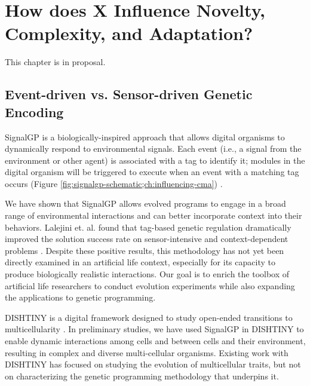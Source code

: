 \chapter{How does X Influence Novelty, Complexity, and Adaptation?}
\label{ch:influencing-cna}

\noindent
This chapter is in proposal.

\section{Event-driven vs. Sensor-driven Genetic Encoding}

SignalGP is a biologically-inspired approach that allows digital organisms to dynamically respond to environmental signals.
Each event (i.e., a signal from the environment or other agent) is associated with a tag to identify it; modules in the digital organism will be triggered to execute when an event with a matching tag occurs (Figure \ref{fig:signalgp-schematic;ch:influencing-cma}) \citep{lalejini2018evolving}.

We have shown that SignalGP allows evolved programs to engage in a broad range of environmental interactions and can better incorporate context into their behaviors.
Lalejini et. al. found that tag-based genetic regulation dramatically improved the solution success rate on sensor-intensive and context-dependent problems \citep{lalejini2018evolving, lalejini2021tag}.
Despite these positive results, this methodology has not yet been directly examined in an artificial life context, especially for its capacity to produce biologically realistic interactions.
Our goal is to enrich the toolbox of artificial life researchers to conduct evolution experiments while also expanding the applications to genetic programming.



DISHTINY is a digital framework designed to study open-ended transitions to multicellularity \citep{moreno2019toward}.
In preliminary studies, we have used SignalGP in DISHTINY to enable dynamic interactions among cells and between cells and their environment, resulting in complex and diverse multi-cellular organisms.
Existing work with DISHTINY has focused on studying the evolution of multicellular traits, but not on characterizing the genetic programming methodology that underpins it.

